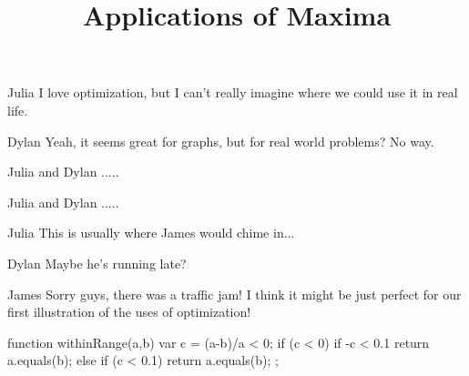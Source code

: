 \documentclass{ximera}
\title{Applications of Maxima}
\begin{document}
\maketitle
\begin{dialogue}
\item[Julia] I love optimization, but I can't really imagine where we could use it in real life.
\item[Dylan] Yeah, it seems great for graphs, but for real world problems? No way.
\item[Julia and Dylan] .....
\item[Julia and Dylan] .....
\item[Julia] This is usually where James would chime in...
\item[Dylan] Maybe he's running late?
\item[James] Sorry guys, there was a traffic jam! I think it might be just perfect for our first illustration of the uses of optimization!
\end{dialogue}
\begin{javascript}
function withinRange(a,b) {
    var c = (a-b)/a < 0;
    if (c < 0) {
        if -c < 0.1 {
            return a.equals(b);
            }
        }
    else {
        if (c < 0.1){
            return a.equals(b);
            }
        }
  };
\end{javascript}
\end{document}
